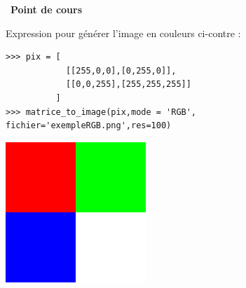\documentclass[a4paper, french, 12pt]{article}
\newcounter{cours}
\newenvironment{cours}[1]
{\par \medskip   \addtocounter{cours}{1} \noindent  
\begin{bclogo}[arrondi =0.1,  ombre = true, barre=none, logo=\bcbook, marge=4]{~\textbf{Point de cours} \textbf{\thecours} {\itshape #1} }  \par}
{
\end{bclogo}
 \par \bigskip }
\begin{document}
\begin{cours}{}
\begin{itemize}[label=]
\begin{minipage}{0.65\linewidth}
Expression pour générer l'image en couleurs ci-contre :

\begin{lstlisting}[style=compil]
>>> pix = [
			[[255,0,0],[0,255,0]],
			[[0,0,255],[255,255,255]]
		  ]
>>> matrice_to_image(pix,mode = 'RGB', 
fichier='exempleRGB.png',res=100)
\end{lstlisting}
\end{minipage}
\hfill
\begin{minipage}{0.3\linewidth}
\begin{center}
\includegraphics[scale=0.5]{images/exempleRGB.png}
\end{center}
\end{minipage}

\end{itemize}


\end{cours}

\vspace*{-20pt}
\end{document}
